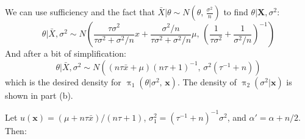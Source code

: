 \documentclass[11pt]{article}
\begin{document}
We can use sufficiency and the fact that $\bar{X}|\theta \sim N(\theta, \, \frac{\sigma^2}{n})$ to find $\theta|\mathbf{X}, \sigma^2$:
\[ \theta | \bar{X}, \sigma^2 \sim 
  N\left(
    \frac{\tau\sigma^2}{\tau\sigma^2 + \sigma^2/n}x + \frac{\sigma^2/n}{\tau\sigma^2 + \sigma^2/n}\mu, \,
    \left( \frac{1}{\tau\sigma^2} + \frac{1}{\sigma^2/n}\right)^{-1}
  \right) 
\]
And after a bit of simplification:
\[ \theta | \bar{X}, \sigma^2 \sim 
  N\left(
    (n\tau\bar{x} + \mu)(n\tau + 1)^{-1}, \,
    \sigma^2(\tau^{-1} + n)
  \right) 
\]
which is the desired density for $\operatorname{\pi}_1(\theta | \sigma^2, \, \mathbf{x})$.  The density of $\operatorname{\pi}_2(\sigma^2|\mathbf{x})$ is shown in part (b).
\item %
  Let $u(\mathbf{x}) = (\mu + n\tau\bar x)/(n\tau+1)$, $\sigma_1^2 = (\tau^{-1}+n)^{-1} \sigma^2$, and $\alpha' = \alpha+n/2$.  Then:
\end{document}
